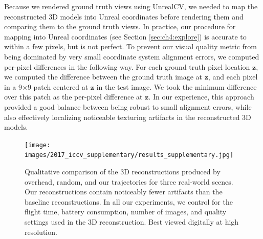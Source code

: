 Because we rendered ground truth views using UnrealCV, we needed to map the reconstructed 3D models into Unreal coordinates before rendering them and comparing them to the ground truth views.
In practice, our procedure for mapping into Unreal coordinates (see Section \ref{sec:ch4:explore}) is accurate to within a few pixels, but is not perfect.
To prevent our visual quality metric from being dominated by very small coordinate system alignment errors, we computed per-pixel differences in the following way.
For each ground truth pixel location $\mathbf{z}$, we computed the difference between the ground truth image at $\mathbf{z}$, and each pixel in a 9$\times$9 patch centered at $\mathbf{z}$ in the test image.
We took the minimum difference over this patch as the per-pixel difference at $\mathbf{z}$.
In our experience, this approach provided a good balance between being robust to small alignment errors, while also effectively localizing noticeable texturing artifacts in the reconstructed 3D models.

\begin{figure}[t]
\begin{center}
\texttt{[image: images/2017\_iccv\_supplementary/results\_supplementary.jpg]}
\end{center}
\caption{
Qualitative comparison of the 3D reconstructions produced by overhead, random, and our trajectories for three real-world scenes.
Our reconstructions contain noticeably fewer artifacts than the baseline reconstructions.
In all our experiments, we control for the flight time, battery consumption, number of images, and quality settings used in the 3D reconstruction.
Best viewed digitally at high resolution.
}
\label{fig:ch4:results_supplementary}
\end{figure}

